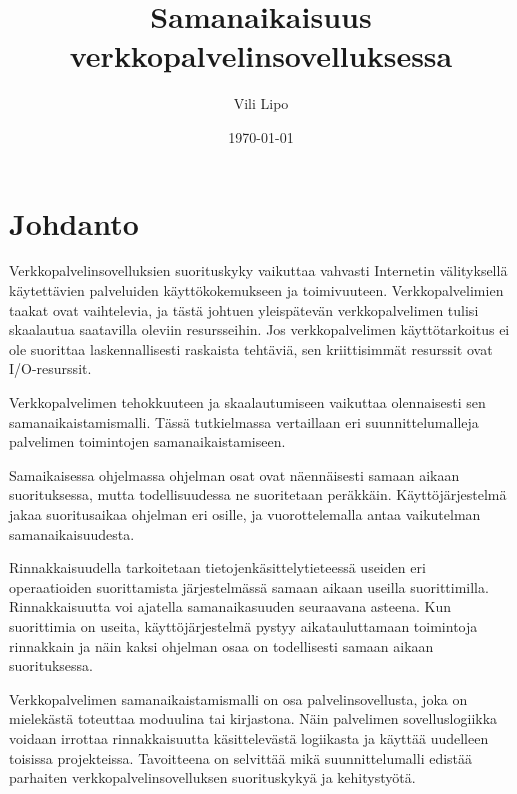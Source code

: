 \documentclass[finnish]{tktltiki2}
\title{Samanaikaisuus verkkopalvelinsovelluksessa}
\author{Vili Lipo}
\date{\today}
\theoremstyle{definition}
\theoremstyle{remark}
\begin{document}
\frontmatter      %

\maketitle        %
\makeabstract     %

\tableofcontents  %


\mainmatter       %

\section{Johdanto}
Verkkopalvelinsovelluksien suorituskyky vaikuttaa vahvasti
Internetin välityksellä käytettävien palveluiden käyttökokemukseen ja toimivuuteen.
Verkkopalvelimien taakat ovat vaihtelevia, ja tästä johtuen
yleispätevän verkkopalvelimen tulisi skaalautua saatavilla oleviin resursseihin.
Jos verkkopalvelimen käyttötarkoitus ei ole suorittaa laskennallisesti raskaista
tehtäviä, sen
kriittisimmät resurssit ovat I/O-resurssit.

Verkkopalvelimen tehokkuuteen ja skaalautumiseen vaikuttaa olennaisesti
sen samanaikaistamismalli. Tässä
tutkielmassa vertaillaan eri suunnittelumalleja palvelimen toimintojen samanaikaistamiseen.

Samaikaisessa ohjelmassa ohjelman osat ovat näennäisesti samaan
aikaan suorituksessa, mutta todellisuudessa ne suoritetaan peräkkäin.
Käyttöjärjestelmä jakaa suoritusaikaa ohjelman eri osille,
ja vuorottelemalla antaa vaikutelman samanaikaisuudesta.

Rinnakkaisuudella tarkoitetaan tietojenkäsittelytieteessä useiden
eri operaatioiden suorittamista järjestelmässä samaan aikaan useilla suorittimilla.
Rinnakkaisuutta voi
ajatella samanaikasuuden seuraavana asteena. Kun suorittimia
on useita, käyttöjärjestelmä pystyy aikatauluttamaan toimintoja
rinnakkain ja näin kaksi ohjelman osaa on todellisesti
samaan aikaan suorituksessa.

Verkkopalvelimen samanaikaistamismalli on osa palvelinsovellusta,
joka on mielekästä toteuttaa moduulina tai kirjastona.
Näin palvelimen sovelluslogiikka voidaan irrottaa rinnakkaisuutta
käsittelevästä logiikasta ja käyttää uudelleen toisissa projekteissa.
Tavoitteena on selvittää mikä suunnittelumalli edistää
parhaiten verkkopalvelinsovelluksen suorituskykyä ja
kehitystyötä.
\end{document}
